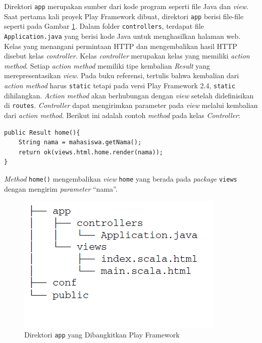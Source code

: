 Direktori \texttt{app} merupakan sumber dari kode program seperti file Java dan \textit{view}. Saat pertama kali proyek Play Framework dibuat, direktori \texttt{app} berisi file-file seperti pada Gambar \ref{fig:2_app_dir}. Dalam folder \texttt{controllers}, terdapat file \texttt{Application.java} yang berisi kode Java untuk menghasilkan halaman web. Kelas yang menangani permintaan HTTP dan mengembalikan hasil HTTP disebut kelas \textit{controller}. Kelas \textit{controller} merupakan kelas yang memiliki \textit{action method}. Setiap \textit{action method} memiliki tipe kembalian \textit{Result} yang merepresentasikan \textit{view}. Pada buku referensi\cite{Leroux:2014}, tertulis bahwa kembalian dari \textit{action method} harus \texttt{static} tetapi pada versi Play Framework 2.4, \texttt{static} dihilangkan. \textit{Action method} akan berhubungan dengan \textit{view} setelah didefinisikan di \texttt{routes}. \textit{Controller} dapat mengirimkan parameter pada \textit{view} melalui kembalian dari \textit{action method}. Berikut ini adalah contoh \textit{method} pada kelas \textit{Controller}:
\begin{lstlisting}
public Result home(){
	String nama = mahasiswa.getNama();
	return ok(views.html.home.render(nama));
}
\end{lstlisting}
\textit{Method} \texttt{home()} mengembalikan \textit{view} \texttt{home} yang berada pada \textit{package} \texttt{views} dengan mengirim \textit{parameter} ``nama''.

\begin{figure}[H]
	\centering
	\includegraphics[scale=0.5]{Gambar/app-dir}
	\caption{Direktori \texttt{app} yang Dibangkitkan Play Framework\cite{Leroux:2014}} 
	\label{fig:2_app_dir}
\end{figure}

